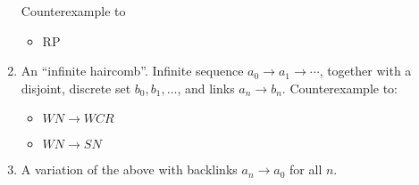 \documentclass{article}
\begin{document}
\begin{enumerate}
  Counterexample to
  \begin{itemize}
    \item RP
  \end{itemize}
  \item An ``infinite haircomb''. Infinite sequence $a_0 \to a_1 \to \cdots$, together with
  a disjoint, discrete set $b_0, b_1, \dots$, and links $a_n \to b_n$.
  Counterexample to:
  \begin{itemize}
    \item $WN\to WCR$
    \item $WN \to SN$
  \end{itemize}
  \item A variation of the above with backlinks $a_n \to a_0$ for all $n$.
\end{enumerate}
\end{document}
